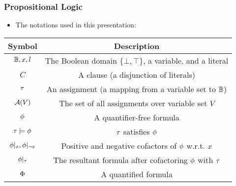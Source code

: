 \begin{frame}
    \frametitle{Propositional Logic}
    \begin{itemize}
        \item The notations used in this presentation:
              \pause
    \end{itemize}
    \begin{table}[t]
        \centering
        \label{tbl:background-symbols}
        \begin{tabular}{c|c}
            Symbol                      & Description                                                   \\
            \hline
            $\mathbb{B},x,l$              & The Boolean domain $\{\bot,\top\}$, a variable, and a literal \\
            $C$                         & A clause (a disjunction of literals)                          \\
            $\tau$                       & An assignment (a mapping from a variable set to $\mathbb{B}$)   \\
            $\mathcal{A}(V)$                    & The set of all assignments over variable set $V$              \\
            $\phi$                       & A quantifier-free formula                                     \\
            $\tau\models\phi$             & $\tau$ satisfies $\phi$                                         \\
            $\phi|_{x},\phi|_{\lnot x}$ & Positive and negative cofactors of $\phi$ w.r.t. $x$           \\
            $\phi|_{\tau}$            & The resultant formula after cofactoring $\phi$ with $\tau$      \\
            $\Phi$                       & A quantified formula                                          \\
        \end{tabular}
    \end{table}
\end{frame}